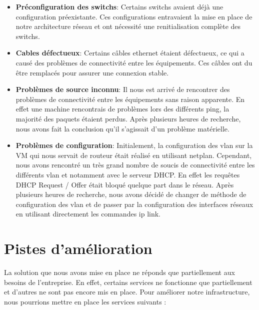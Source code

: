 \documentclass[a4paper,12pt,openany]{report}
\begin{document}
            \begin{itemize}
                \item \textbf{Préconfiguration des switchs}: Certains switchs avaient déjà une configuration préexistante. Ces configurations entravaient la mise en place de notre architecture réseau et ont nécessité une renitialisation complète des switchs.
                \item \textbf{Cables défectueux}: Certains câbles ethernet étaient défectueux, ce qui a causé des problèmes de connectivité entre les équipements. Ces câbles ont du être remplacés pour assurer une connexion stable.
                \item \textbf{Problèmes de source inconnu}: Il nous est arrivé de rencontrer des problèmes de connectivité entre les équipements sans raison apparente. En effet une machine rencontrais de problèmes lors des différents ping, la majorité des paquets étaient perdus. Après plusieurs heures de recherche, nous avons fait la conclusion qu'il s'agissait d'un problème matérielle.
                \item \textbf{Problèmes de configuration}: Initialement, la configuration des vlan sur la VM qui nous servait de routeur était réalisé en utilisant netplan. Cependant, nous avons rencontré un très grand nombre de soucis de connectivité entre les différents vlan et notamment avec le serveur DHCP. En effet les requêtes DHCP Request / Offer était bloqué quelque part dans le réseau. Après plusieurs heures de recherche, nous avons décidé de changer de méthode de configuration des vlan et de passer par la configuration des interfaces réseaux en utilisant directement les commandes ip link. 
            \end{itemize}

        \section{Pistes d'amélioration}
            La solution que nous avons mise en place ne réponds que partiellement aux besoins de l'entreprise. En effet, certains services ne fonctionne que partiellement et d'autres ne sont pas encore mis en place. Pour améliorer notre infrastructure, nous pourrions mettre en place les services suivants :
\end{document}
